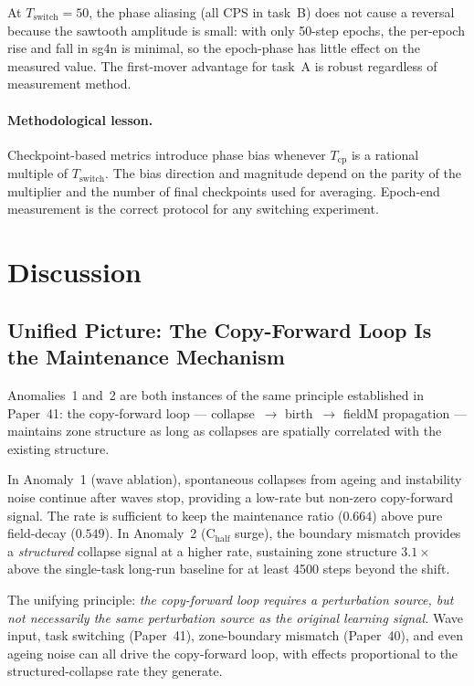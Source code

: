 \documentclass[11pt]{article}
\begin{document}
At $T_\mathrm{switch}=50$, the phase aliasing (all CPS in task~B) does not
cause a reversal because the sawtooth amplitude is small: with only 50-step
epochs, the per-epoch rise and fall in sg4n is minimal, so the epoch-phase
has little effect on the measured value.
The first-mover advantage for task~A is robust regardless of measurement method.

\paragraph{Methodological lesson.}
Checkpoint-based metrics introduce phase bias whenever $T_\mathrm{cp}$ is a
rational multiple of $T_\mathrm{switch}$.
The bias direction and magnitude depend on the parity of the multiplier and
the number of final checkpoints used for averaging.
Epoch-end measurement is the correct protocol for any switching experiment.

\section{Discussion}

\subsection{Unified Picture: The Copy-Forward Loop Is the Maintenance Mechanism}

Anomalies~1 and~2 are both instances of the same principle established in
Paper~41: the copy-forward loop --- collapse~$\rightarrow$ birth~$\rightarrow$
fieldM propagation --- maintains zone structure as long as collapses are
spatially correlated with the existing structure.

In Anomaly~1 (wave ablation), spontaneous collapses from ageing and instability
noise continue after waves stop, providing a low-rate but non-zero copy-forward
signal.
The rate is sufficient to keep the maintenance ratio ($0.664$) above pure
field-decay ($0.549$).
In Anomaly~2 (C$_\mathrm{half}$ surge), the boundary mismatch provides a
\emph{structured} collapse signal at a higher rate, sustaining zone structure
$3.1\times$ above the single-task long-run baseline for at least 4500 steps
beyond the shift.

The unifying principle: \emph{the copy-forward loop requires a perturbation
source, but not necessarily the same perturbation source as the original
learning signal.}
Wave input, task switching (Paper~41), zone-boundary mismatch (Paper~40), and
even ageing noise can all drive the copy-forward loop, with effects proportional
to the structured-collapse rate they generate.
\end{document}
